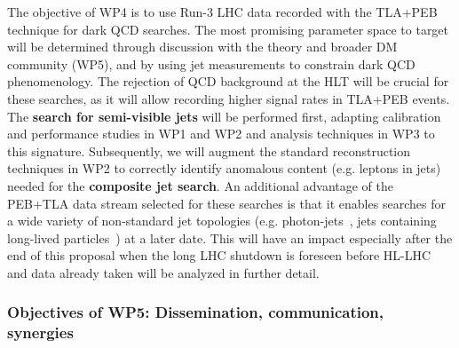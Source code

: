 The objective of WP4 is to use Run-3 LHC data recorded with the TLA+PEB technique for dark QCD searches. 
The most promising parameter space to target will be determined through discussion with the theory and broader DM community (WP5), and by using jet measurements to constrain dark QCD phenomenology. 
The rejection of QCD background at the HLT will be crucial for these searches, as it will allow recording higher signal rates in TLA+PEB events. 
The \textbf{search for semi-visible jets} will be performed first, adapting calibration and performance studies in WP1 and WP2 and analysis techniques in WP3 to this signature. 
Subsequently, we will augment the standard reconstruction techniques in WP2 to correctly identify anomalous content (e.g. leptons in jets) needed for the \textbf{composite jet search}.
An additional advantage of the PEB+TLA data stream selected for these searches is that it enables searches for a wide variety of non-standard jet topologies (e.g. photon-jets~\cite{ToBeCited}, %
jets containing long-lived particles~\cite{ToBeCited}) %
at a later date. 
This will have an impact especially after the end of this proposal when the long LHC shutdown is foreseen before HL-LHC and data already taken will be analyzed in further detail. 

\subsubsection{Objectives of WP5: Dissemination, communication, synergies}

